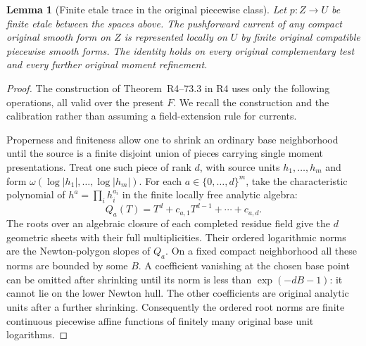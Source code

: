 \documentclass[11pt,a4paper]{article}
\numberwithin{equation}{section}
\newtheorem{lemma}[theorem]{Lemma}
\theoremstyle{definition}
\theoremstyle{remark}
\begin{document}
\begin{lemma}[Finite etale trace in the original piecewise class]
\label{lem:r5-prescribed-finite-trace}
Let $p:Z\to U$ be finite etale between the spaces above. The
pushforward current of any compact original smooth form on $Z$ is
represented locally on $U$ by finite original compatible piecewise
smooth forms. The identity holds on every original complementary
test and every further original moment refinement.
\end{lemma}

\begin{proof}
The construction of Theorem~\textup{R4--73.3}
in R4 uses only the following
operations, all valid over the present $F$. We recall the construction
and the calibration rather than assuming a field-extension rule for
currents.

Properness and finiteness allow one to shrink an ordinary base
neighborhood until the source is a finite disjoint union of pieces
carrying single moment presentations. Treat one such piece of rank
$d$, with source units $h_1,\ldots,h_m$ and form
$\omega(\log|h_1|,\ldots,\log|h_m|)$. For each
$a\in\{0,\ldots,d\}^m$, take the characteristic polynomial of
$h^a=\prod_i h_i^{a_i}$ in the finite locally free analytic algebra:
\[
 Q_a(T)=T^d+c_{a,1}T^{d-1}+\cdots+c_{a,d}.
\]
The roots over an algebraic closure of each completed residue field
give the $d$ geometric sheets with their full multiplicities. Their
ordered logarithmic norms are the Newton-polygon slopes of $Q_a$.
On a fixed compact neighborhood all these norms are bounded by
some $B$. A coefficient vanishing at the chosen base point can be
omitted after shrinking until its norm is less than
$\exp(-dB-1)$: it cannot lie on the lower Newton hull. The other
coefficients are original analytic units after a further shrinking.
Consequently the ordered root norms are finite continuous piecewise
affine functions of finitely many original base unit logarithms.


\end{proof}
\end{document}
